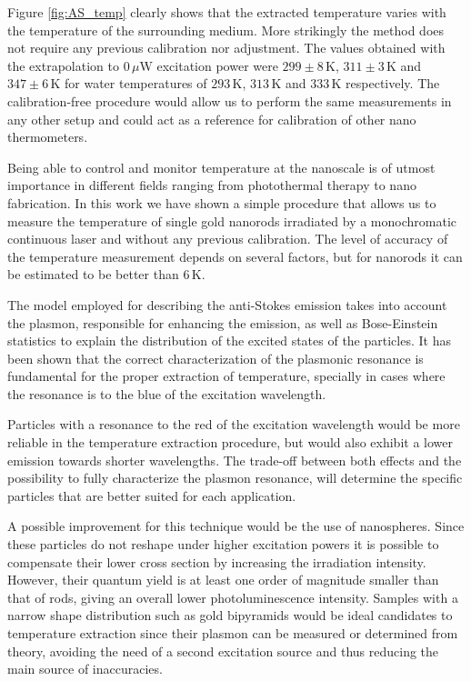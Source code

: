 \documentclass[journal=nalefd,manuscript=letter]{achemso}
\newcommand{\K}{\ensuremath{\,\textrm{K}}}
\newcommand{\uW}{\ensuremath{\,\mu\textrm{W}}}
\begin{document}
Figure \ref{fig:AS_temp} clearly shows that the extracted temperature varies
with the temperature of the surrounding medium. More strikingly the method does
not require any previous calibration nor adjustment. The values obtained with
the extrapolation to $0\uW$ excitation power were $299 \pm 8\K$, $311\pm 3\K$
and $347 \pm 6\K$ for water temperatures of $293\K$, $313\K$ and $333\K$
respectively. The calibration-free procedure would allow us to perform the same
measurements in any other setup and could act as a reference for calibration of
other nano thermometers.




Being able to control and monitor temperature at the nanoscale is of utmost
importance in different fields ranging from photothermal therapy\cite{Huang2006}
to nano fabrication\cite{Fedoruk2013}. In this work we have shown a simple
procedure that allows us to measure the temperature of single gold nanorods
irradiated by a monochromatic continuous laser and without any previous
calibration. The level of accuracy of the temperature measurement depends on
several factors, but for nanorods it can be estimated to be better than $6\K$.

The model employed for describing the anti-Stokes emission takes into account
the plasmon, responsible for enhancing the emission, as well as Bose-Einstein
statistics to explain the distribution of the excited states of the particles.
It has been shown that the correct characterization of the plasmonic resonance is
fundamental for the proper extraction of temperature, specially in cases
where the resonance is to the blue of the excitation wavelength.

Particles with a resonance to the red of the excitation wavelength would be more
reliable in the temperature extraction procedure, but would also exhibit a lower
emission towards shorter wavelengths. The trade-off between both effects and
the possibility to fully characterize the plasmon resonance, will determine the
specific particles that are better suited for each application.

A possible improvement for this technique would be the use of nanospheres. 
Since these particles do not reshape under higher excitation powers it 
is possible to compensate their 
lower cross section by increasing the irradiation intensity. However, their
quantum yield is at least one order of magnitude smaller than that of rods,
giving an overall lower photoluminescence intensity. Samples with a narrow shape
distribution such as gold bipyramids\cite{Pelton2009} would be ideal candidates to
temperature extraction since their plasmon can be measured or determined from
theory, avoiding the need of a second excitation source and thus reducing 
the main source of inaccuracies. 
\end{document}

